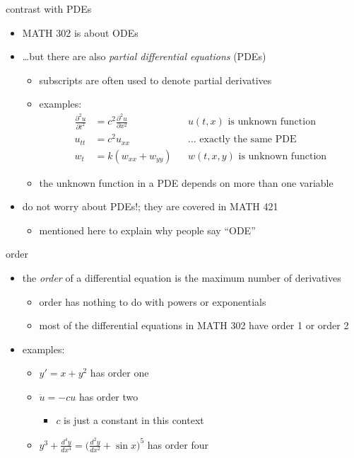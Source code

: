 \documentclass{beamer}
\begin{document}
\begin{frame}{contrast with PDEs}

\begin{itemize}
\item MATH 302 is about ODEs
\item \dots but there are also \emph{partial differential equations} (PDEs)
    \begin{itemize}
    \item subscripts are often used to denote partial derivatives
    \item examples:
\begin{align*}
\frac{\partial^2 u}{\partial t^2} &= c^2 \frac{\partial^2 u}{\partial x^2} && u(t,x) \text{ is unknown function} \\
u_{tt} &= c^2 u_{xx} && \dots \text{ exactly the same PDE} \\
w_t &= k(w_{xx} + w_{yy}) && w(t,x,y) \text{ is unknown function}
\end{align*}
    \item the unknown function in a PDE depends on more than one variable
    \end{itemize}
\item do not worry about PDEs!; they are covered in MATH 421
    \begin{itemize}
    \item mentioned here to explain why people say ``ODE''
    \end{itemize}
\end{itemize}
\end{frame}

\begin{frame}{order}

\begin{itemize}
\item the \emph{order} of a differential equation is the maximum number of derivatives
    \begin{itemize}
    \item order has nothing to do with powers or exponentials
    \item most of the differential equations in MATH 302 have order 1 or order 2
    \end{itemize}
\item examples:
    \begin{itemize}
    \item $y' = x + y^2$ has order one
    \item $\ddot u = - c u$ has order two
        \begin{itemize}
        \item $c$ is just a constant in this context
        \end{itemize}
    \item $y^3 + \frac{d^4 y}{dx^4} = \big(\frac{d^2 y}{dx^2} + \sin x\big)^5$ has order four
    \end{itemize}
\end{itemize}
\end{frame}
\end{document}

